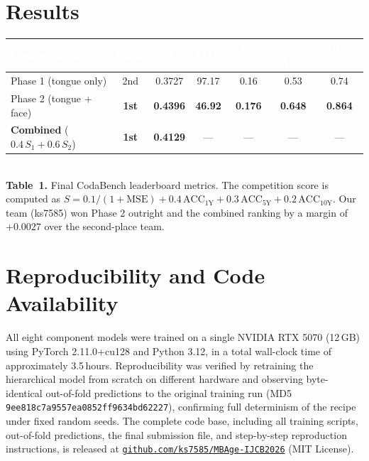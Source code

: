 \documentclass[9pt,letterpaper]{extarticle}
\begin{document}
\section*{Results}
\begin{table}[h!]
\vspace{-4pt}
\centering
\footnotesize
\renewcommand{\arraystretch}{1.05}
\begin{tabular}{@{}lcccccc@{}}
\toprule
\rowcolor{tablehead}
\textcolor{white}{\textbf{Configuration}} &
\textcolor{white}{\textbf{Rank}} &
\textcolor{white}{\textbf{S}} &
\textcolor{white}{\textbf{MSE}} &
\textcolor{white}{\textbf{1Y-ACC}} &
\textcolor{white}{\textbf{5Y-ACC}} &
\textcolor{white}{\textbf{10Y-ACC}} \\
\midrule
\rowcolor{tablerow}
Phase 1 (tongue only)        & 2nd & 0.3727 & 97.17 & 0.16 & 0.53 & 0.74 \\
Phase 2 (tongue + face)      & \textbf{1st} & \textbf{0.4396} & \textbf{46.92} & \textbf{0.176} & \textbf{0.648} & \textbf{0.864} \\
\rowcolor{tablehighlight}
\textbf{Combined} ($0.4\,S_1 + 0.6\,S_2$) & \textbf{1st} & \textbf{0.4129} & --- & --- & --- & --- \\
\bottomrule
\end{tabular}\\[3pt]
{\footnotesize\color{captiongray}\textbf{Table~1.} Final CodaBench leaderboard
metrics. The competition score is computed as
$S = 0.1/(1+\mathrm{MSE}) + 0.4\,\mathrm{ACC}_{1\mathrm{Y}}
+ 0.3\,\mathrm{ACC}_{5\mathrm{Y}} + 0.2\,\mathrm{ACC}_{10\mathrm{Y}}$.
Our team (ks7585) won Phase 2 outright and the combined ranking by a margin
of $+0.0027$ over the second-place team.}
\end{table}

\section*{Reproducibility and Code Availability}
All eight component models were trained on a single NVIDIA RTX 5070 (12\,GB)
using PyTorch 2.11.0+cu128 and Python 3.12, in a total wall-clock time of
approximately 3.5\,hours. Reproducibility was verified by retraining the
hierarchical model from scratch on different hardware and observing
byte-identical out-of-fold predictions to the original training run
(MD5 \texttt{9ee818c7a9557ea0852ff9634bd62227}), confirming full determinism
of the recipe under fixed random seeds. The complete code base, including all
training scripts, out-of-fold predictions, the final submission file, and
step-by-step reproduction instructions, is released at
\href{https://github.com/ks7585/MBAge-IJCB2026}{\nolinkurl{github.com/ks7585/MBAge-IJCB2026}}
(MIT License).
\end{document}
